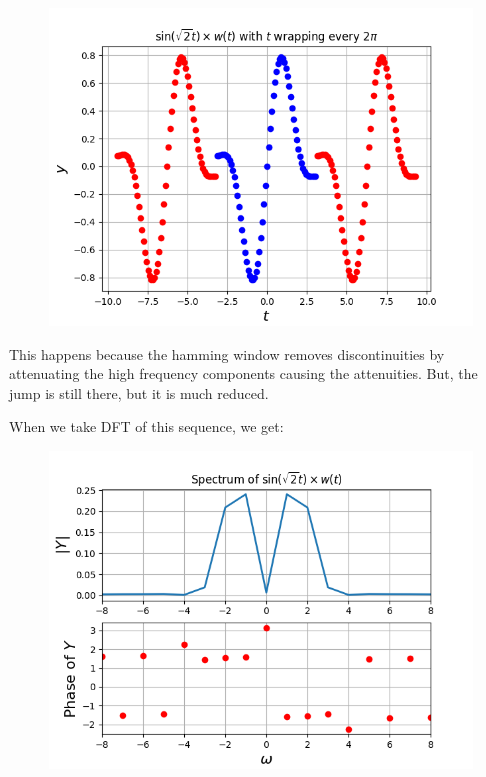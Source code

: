 \documentclass[11pt, a4paper]{article}
\begin{document}
\begin{figure}[!tbh]
\centering
\includegraphics[scale=0.55]{assgn10_plot5.png} 
\label{fig5}
\end{figure} 

This happens because the hamming window removes discontinuities by attenuating the high frequency components causing the attenuities. But, the jump is still there, but it is much reduced.

When we take DFT of this sequence, we get:

\begin{figure}[!tbh]
\centering
\includegraphics[scale=0.65]{assgn10_plot6.png} 
\label{fig6}
\end{figure} 
\end{document}
